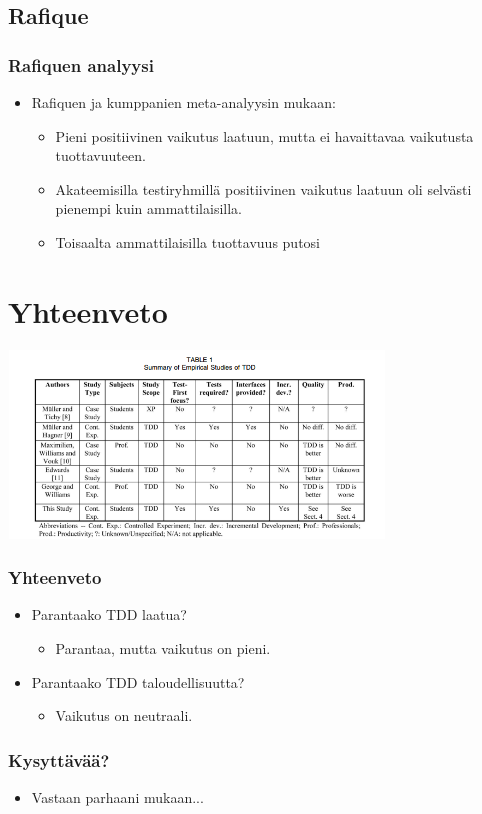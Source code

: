 \documentclass{beamer}
\begin{document}
\subsection{Rafique}
\begin{frame}
    	\frametitle{Rafiquen analyysi}
	\begin{itemize}
	\item Rafiquen ja kumppanien meta-analyysin mukaan:
			\begin{itemize}
		\item Pieni positiivinen vaikutus laatuun, mutta ei havaittavaa vaikutusta tuottavuuteen.
		\item Akateemisilla testiryhmillä positiivinen vaikutus laatuun oli selvästi pienempi kuin ammattilaisilla.
		\item Toisaalta ammattilaisilla tuottavuus putosi 

		\end{itemize}

	\end{itemize}

\end{frame}

\section{Yhteenveto}

\begin{frame}
	\includegraphics[width=10cm,height=5cm]{table.png}
    	\frametitle{Yhteenveto}
	\begin{itemize}
	\item Parantaako TDD laatua?
		\begin{itemize}
		\item Parantaa, mutta vaikutus on pieni.
		\end{itemize}
	\item Parantaako TDD taloudellisuutta?
		\begin{itemize}
		\item Vaikutus on neutraali.
		\end{itemize}
		

	\end{itemize}

\end{frame}

\begin{frame}
    	\frametitle{Kysyttävää?}
	\begin{itemize}
	\item Vastaan parhaani mukaan...

	\end{itemize}

\end{frame}
\end{document}
